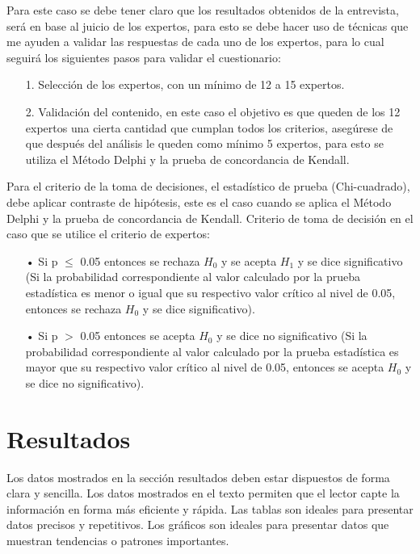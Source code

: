 \documentclass[12pt, a4paper, nofontenc, numbers=endperiod]{apa7}
\begin{document}
{\setlength{\parindent}{1.27cm}Para este caso se debe tener claro que los resultados obtenidos de la entrevista, será en base al juicio de los expertos, para esto se debe hacer uso de técnicas que me ayuden a validar las respuestas de cada uno de los expertos, para lo cual seguirá los siguientes pasos para validar el cuestionario:
{\doublespacing
\begin{itemize}[leftmargin=1.70cm]
	\item[1.] Selección de los expertos, con un mínimo de 12 a 15 expertos.
	\item[2.] Validación del contenido, en este caso el objetivo es que queden de los 12 expertos una cierta cantidad que cumplan todos los criterios, asegúrese de que después del análisis le queden como mínimo 5 expertos, para esto se utiliza el Método Delphi y la prueba de concordancia de Kendall.
\end{itemize}
}
\setlength{\parindent}{1.27cm}Para el criterio de la toma de decisiones, el estadístico de prueba (Chi-cuadrado), debe aplicar contraste de hipótesis, este es el caso cuando se aplica el Método Delphi y la prueba de concordancia de Kendall.
\setlength{\parindent}{1.27cm}Criterio de toma de decisión en el caso que se utilice el criterio de expertos: 
{\doublespacing
\begin{itemize}[leftmargin=1.70cm]	
	\item[•] Si p $\leq$ 0.05 entonces se rechaza $H_{0}$ y se acepta $H_{1}$ y se dice significativo (Si la probabilidad correspondiente al valor calculado por la prueba estadística es menor o igual que su respectivo valor crítico al nivel de 0.05, entonces se rechaza $H_{0}$ y se dice significativo). 	
	\item[•] Si p $>$ 0.05 entonces se acepta $H_{0}$ y se dice no significativo (Si la probabilidad correspondiente al valor calculado por la prueba estadística es mayor que su respectivo valor crítico al nivel de 0.05, entonces se acepta $H_{0}$ y se dice no significativo).
\end{itemize}	
}
\vspace*{-4mm}
\section*{\normalsize \centering Resultados}
\setlength{\parindent}{1.27cm}Los datos mostrados en la sección resultados deben estar dispuestos de forma clara y sencilla. Los datos mostrados en el texto permiten que el lector capte la información en forma más eficiente y rápida. Las tablas son ideales para presentar datos precisos y repetitivos. Los gráficos son ideales para presentar datos que muestran tendencias o patrones importantes.

}
\end{document}
